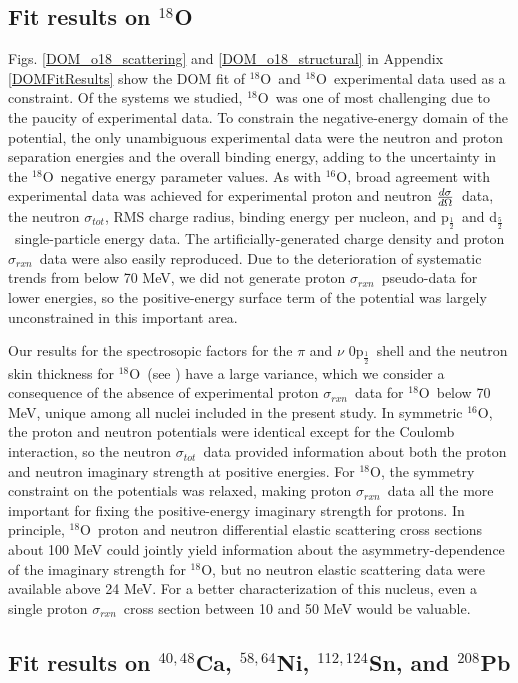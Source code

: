 \documentclass[twocolumn,secnumarabic,amssymb, nobibnotes, aps, prl,
superscriptaddress, nobalancelastpage]{revtex4}
\newcommand{\tot}{\ensuremath{\sigma_{tot}}}
\newcommand{\rxn}{\ensuremath{\sigma_{rxn}}}
\newcommand{\el}{\ensuremath{\frac{\lowercase{d}\sigma}{\lowercase{d}\Omega}}}
\newcommand{\oSix}{\ensuremath{^{16}}O}
\newcommand{\oEight}{\ensuremath{^{18}}O}
\newcommand{\caAughtEight}{\ensuremath{^{40,48}}C\lowercase{a}}
\newcommand{\niEightFour}{\ensuremath{^{58,64}}N\lowercase{i}}
\newcommand{\snTwelveFour}{\ensuremath{^{112,124}}S\lowercase{n}}
\newcommand{\pbEight}{\ensuremath{^{208}}P\lowercase{b}}
\newcommand{\pOne}{p\ensuremath{_{\frac{1}{2}}}}
\newcommand{\dFive}{d\ensuremath{_{\frac{5}{2}}}}
\begin{document}
\subsection{Fit results on $^{18}$O}
Figs. \ref{DOM_o18_scattering} and \ref{DOM_o18_structural} in Appendix
\ref{DOMFitResults} show the DOM fit of \oEight\ and \oEight\ experimental data
used as a constraint. Of the systems we studied, \oEight\ was one of most challenging due to the 
paucity of experimental data. To constrain the negative-energy domain
of the potential, the only unambiguous experimental data were the neutron
and proton separation energies and the overall binding energy, adding
to the uncertainty in the \oEight\ negative energy parameter values.
As with \oSix, broad agreement with experimental data was achieved for
experimental proton and neutron \el\ data, the neutron \tot, RMS charge radius,
binding energy per nucleon, and \pOne\ and \dFive\ single-particle energy data.
The artificially-generated charge density and proton \rxn\ data were also
easily reproduced. Due to the deterioration of systematic trends from
\cite{Carlson1975} below 70 MeV, we did not generate proton \rxn\ pseudo-data
for lower energies, so the positive-energy surface term of the potential
was largely unconstrained in this important area.

Our results for the spectrosopic factors for the $\pi$ and $\nu$ 0\pOne\ shell and the
neutron skin thickness for \oEight\ (see \cite{Pruitt2020PRL}) have a large variance,
which we consider a consequence of the absence of experimental proton \rxn\ data for
\oEight\ below 70 MeV, unique among all nuclei included in the present study.
In symmetric \oSix, the proton and neutron potentials were identical except for
the Coulomb interaction, so the neutron \tot\ data provided information about
both the proton and neutron imaginary strength at positive energies. For
\oEight, the symmetry constraint on the potentials was relaxed, making proton
\rxn\ data all the more important for fixing the positive-energy imaginary
strength for protons. In principle, \oEight\ proton and neutron
differential elastic scattering cross sections about 100 MeV could jointly
yield information about the asymmetry-dependence of the imaginary strength for
\oEight, but no neutron elastic scattering data were available above 24 MeV. For
a better characterization of this nucleus, even a single proton \rxn\ cross
section between 10 and 50 MeV would be valuable.

\subsection{Fit results on \caAughtEight, \niEightFour, \snTwelveFour, and \pbEight}
\end{document}
